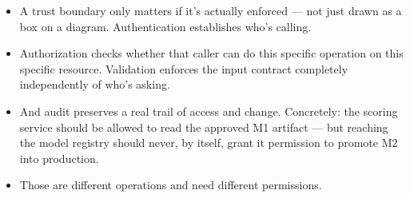 \documentclass[11pt,a4paper]{article}
\begin{document}
\begin{examplebox}[title after break={SPOKEN SCRIPT --- slide 41 continued}]
\begin{itemize}
\item A trust boundary only matters if it's actually enforced — not just drawn as a box on a diagram. Authentication establishes who's calling.
\item Authorization checks whether that caller can do this specific operation on this specific resource. Validation enforces the input contract completely independently of who's asking.
\item And audit preserves a real trail of access and change. Concretely: the scoring service should be allowed to read the approved M1 artifact — but reaching the model registry should never, by itself, grant it permission to promote M2 into production.
\item Those are different operations and need different permissions.
\end{itemize}
\end{examplebox}
\par\noindent{\scriptsize\textcolor{teal!60!black}{Reading anchor: Bass, Ch. 9–10 / §14.2 · NIST SP 800-207, §3}}
\clearpage
\end{document}
